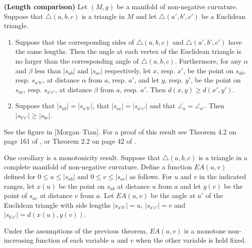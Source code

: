 \begin{theorem}
\label{thm:length-comparison}
\label{lengthcompar}
{\bf (Length comparison)}
Let $(M,g)$ be a manifold of non-negative curvature. Suppose that
$\triangle(a,b,c)$ is a triangle in $M$ and let
$\triangle(a',b',c')$ be a Euclidean triangle.
\begin{enumerate}
\item Suppose that the corresponding
sides of $\triangle(a,b,c)$ and $\triangle(a',b',c')$ have the same
lengths. Then the angle at each vertex of the Euclidean triangle is
no larger than the corresponding angle of $\triangle(a,b,c)$.
Furthermore, for any $\alpha$ and $\beta$ less than $|s_{ab}|$ and
$|s_{ac}|$ respectively, let $x$, resp. $x'$, be the point on
$s_{ab}$, resp. $s_{a'b'}$, at distance $\alpha$ from $a$, resp.
$a'$, and let $y$, resp. $y'$, be the point on $s_{ac}$, resp.
$s_{a'c'}$, at distance $\beta$ from $a$, resp. $a'$. Then
$d(x,y)\ge d(x',y')$.
\item Suppose that $|s_{ab}|=|s_{a'b'}|$, that
$|s_{ac}|=|s_{a'c'}|$ and that $\angle_a=\angle_{a'}$. Then
$|s_{b'c'}|\ge |s_{bc}|$.
\end{enumerate}
\end{theorem}

See the figure in [Morgan--Tian]. For a proof of this result see
Theorem 4.2 on page 161 of \cite{Sakai}, or Theorem 2.2 on page 42
of \cite{CheegerEbin}.


One corollary is a monotonicity result. Suppose that
$\triangle(a,b,c)$ is a triangle in a complete manifold of
non-negative curvature. Define a function $EA(u,v)$ defined for
$0\le u\le |s_{ab}|$ and $0\le v\le |s_{ac}|$ as follows. For $u$
and $v$ in the indicated ranges, let $x(u)$ be the point on $s_{ab}$
at distance $u$ from $a$ and let $y(v)$ be the point of $s_{ac}$ at
distance $v$ from $a$. Let $EA(u,v)$ be the angle at $a'$ of the
Euclidean triangle with side lengths $|s_{a'b'}|=u$, $|s_{a'c'}|=v$
and $|s_{b'c'}|=d(x(u),y(v))$.

\begin{corollary}
\label{cor:angle-monotonicity}
\label{anglemono}
Under the assumptions of the previous theorem, $EA(u,v)$ is a
monotone non-increasing function of each variable $u$ and $v$ when
the other variable is held fixed.
\end{corollary}



